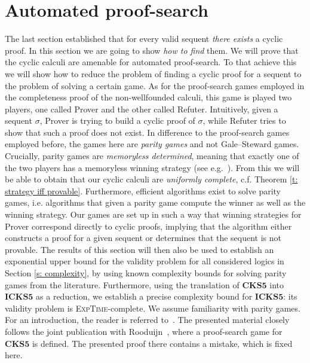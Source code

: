 \documentclass{myifcolog}
\numberwithin{theorem}{section}
\begin{document}
\section{Automated proof-search}\label{s: automated proof-search}

 The last section established that for every valid sequent \emph{there exists} a cyclic proof. In this section we are going to show \emph{how to find} them. We will prove that the cyclic calculi are amenable for automated proof-search. To that achieve this we will show how to reduce the problem of finding a cyclic proof for a sequent to the problem of solving a certain game. As for the proof-search games employed in the completeness proof of the non-wellfounded calculi, this game is played two players, one called Prover and the other called Refuter. Intuitively, given a sequent $\sigma$, Prover is trying to build a cyclic proof of $\sigma$, while Refuter tries to show that such a proof does not exist. In difference to the proof-search games employed before, the games here are \emph{parity games} and not Gale--Steward games. Crucially, parity games are \emph{memoryless determined}, meaning that exactly one of the two players has a memoryless winning strategy (see e.g.~\cite[Chapter 6]{graedel_2001}). From this we will be able to obtain that our cyclic calculi are \emph{uniformly complete}, c.f. Theorem \ref{t: strategy iff provable}. Furthermore, efficient algorithms exist to solve parity games, i.e. algorithms that given a parity game compute the winner as well as the winning strategy. Our games are set up in such a way that winning strategies for Prover correspond directly to cyclic proofs, implying that the algorithm either constructs a proof for a given sequent or determines that the sequent is not provable. The results of this section will then also be used to establish an exponential upper bound for the validity problem for all considered logics in Section \ref{s: complexity}, by using known complexity bounds for solving parity games from the literature. Furthermore, using the translation of $\mathbf{CKS5}$ into $\mathbf{ICKS5}$ as a reduction, we establish a precise complexity bound for $\mathbf{ICKS5}$: its validity problem is \textsc{ExpTime}-complete. We assume familiarity with parity games. For an introduction, the reader is referred to~\cite[Chapter 2]{graedel_2001}. The presented material closely follows the joint publication with Rooduijn~\cite[Section 6]{rooduijn_analytic_2022}, where a proof-search game for $\mathbf{CKS5}$ is defined. The presented proof there contains a mistake, which is fixed here.
\end{document}
